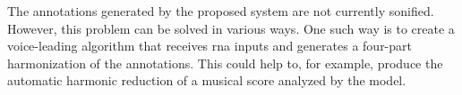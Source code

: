 
The annotations generated by the proposed system are not
currently sonified. However, this problem can be solved in
various ways. One such way is to create a voice-leading
algorithm that receives \gls{rna} inputs and generates a
four-part harmonization of the annotations. This could help
to, for example, produce the automatic harmonic reduction of
a musical score analyzed by the model.
